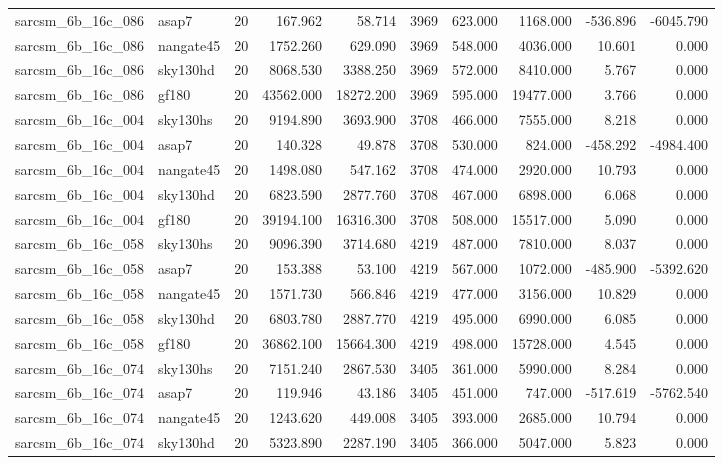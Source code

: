 \begin{tabular}{llrrrrrrrr}
sarcsm\_6b\_16c\_086 & asap7 & 20 & 167.962 & 58.714 & 3969 & 623.000 & 1168.000 & -536.896 & -6045.790 \\
sarcsm\_6b\_16c\_086 & nangate45 & 20 & 1752.260 & 629.090 & 3969 & 548.000 & 4036.000 & 10.601 & 0.000 \\
sarcsm\_6b\_16c\_086 & sky130hd & 20 & 8068.530 & 3388.250 & 3969 & 572.000 & 8410.000 & 5.767 & 0.000 \\
sarcsm\_6b\_16c\_086 & gf180 & 20 & 43562.000 & 18272.200 & 3969 & 595.000 & 19477.000 & 3.766 & 0.000 \\
sarcsm\_6b\_16c\_004 & sky130hs & 20 & 9194.890 & 3693.900 & 3708 & 466.000 & 7555.000 & 8.218 & 0.000 \\
sarcsm\_6b\_16c\_004 & asap7 & 20 & 140.328 & 49.878 & 3708 & 530.000 & 824.000 & -458.292 & -4984.400 \\
sarcsm\_6b\_16c\_004 & nangate45 & 20 & 1498.080 & 547.162 & 3708 & 474.000 & 2920.000 & 10.793 & 0.000 \\
sarcsm\_6b\_16c\_004 & sky130hd & 20 & 6823.590 & 2877.760 & 3708 & 467.000 & 6898.000 & 6.068 & 0.000 \\
sarcsm\_6b\_16c\_004 & gf180 & 20 & 39194.100 & 16316.300 & 3708 & 508.000 & 15517.000 & 5.090 & 0.000 \\
sarcsm\_6b\_16c\_058 & sky130hs & 20 & 9096.390 & 3714.680 & 4219 & 487.000 & 7810.000 & 8.037 & 0.000 \\
sarcsm\_6b\_16c\_058 & asap7 & 20 & 153.388 & 53.100 & 4219 & 567.000 & 1072.000 & -485.900 & -5392.620 \\
sarcsm\_6b\_16c\_058 & nangate45 & 20 & 1571.730 & 566.846 & 4219 & 477.000 & 3156.000 & 10.829 & 0.000 \\
sarcsm\_6b\_16c\_058 & sky130hd & 20 & 6803.780 & 2887.770 & 4219 & 495.000 & 6990.000 & 6.085 & 0.000 \\
sarcsm\_6b\_16c\_058 & gf180 & 20 & 36862.100 & 15664.300 & 4219 & 498.000 & 15728.000 & 4.545 & 0.000 \\
sarcsm\_6b\_16c\_074 & sky130hs & 20 & 7151.240 & 2867.530 & 3405 & 361.000 & 5990.000 & 8.284 & 0.000 \\
sarcsm\_6b\_16c\_074 & asap7 & 20 & 119.946 & 43.186 & 3405 & 451.000 & 747.000 & -517.619 & -5762.540 \\
sarcsm\_6b\_16c\_074 & nangate45 & 20 & 1243.620 & 449.008 & 3405 & 393.000 & 2685.000 & 10.794 & 0.000 \\
sarcsm\_6b\_16c\_074 & sky130hd & 20 & 5323.890 & 2287.190 & 3405 & 366.000 & 5047.000 & 5.823 & 0.000 \\

\end{tabular}
